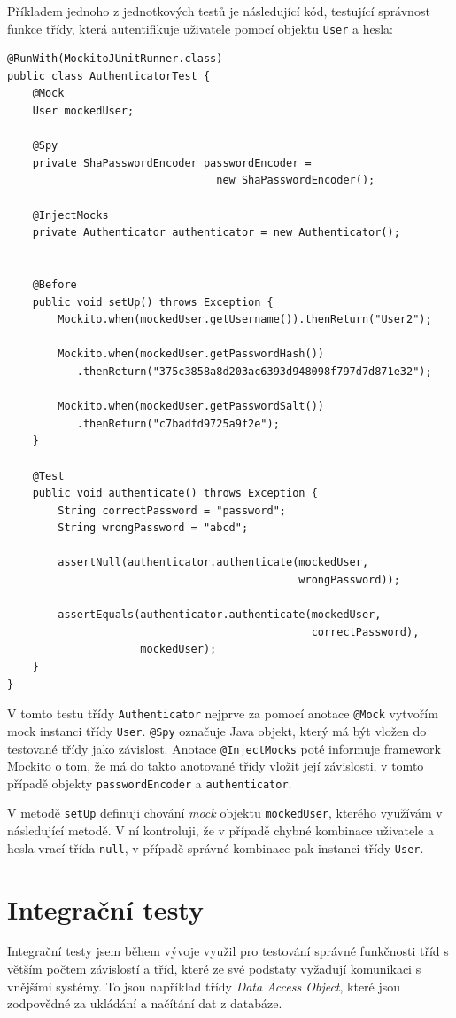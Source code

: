 \documentclass[thesis=B,czech]{FITthesis}[2012/06/26]
\begin{document}
		Příkladem jednoho z jednotkových testů je následující kód, testující správnost funkce třídy, která autentifikuje uživatele pomocí objektu \texttt{User} a hesla:
		
		\begin{Verbatim}[obeytabs,tabsize=2]
@RunWith(MockitoJUnitRunner.class)
public class AuthenticatorTest {
	@Mock
	User mockedUser;
	
	@Spy
	private ShaPasswordEncoder passwordEncoder = 
	                             new ShaPasswordEncoder();
	
	@InjectMocks
	private Authenticator authenticator = new Authenticator();
	
	
	@Before
	public void setUp() throws Exception {
		Mockito.when(mockedUser.getUsername()).thenReturn("User2");
		
		Mockito.when(mockedUser.getPasswordHash())
		   .thenReturn("375c3858a8d203ac6393d948098f797d7d871e32");
		       
		Mockito.when(mockedUser.getPasswordSalt())
		   .thenReturn("c7badfd9725a9f2e");
	}
	
	@Test
	public void authenticate() throws Exception {
		String correctPassword = "password";
		String wrongPassword = "abcd";
		
		assertNull(authenticator.authenticate(mockedUser, 
		                                      wrongPassword));
		                                      
		assertEquals(authenticator.authenticate(mockedUser, 
		                                        correctPassword), 
		             mockedUser);
	}
}
		\end{Verbatim}
		
				
		V tomto testu třídy \texttt{Authenticator} nejprve za pomocí anotace \texttt{@Mock} vytvořím mock instanci třídy \texttt{User}. \texttt{@Spy} označuje  Java objekt, který má být vložen do testované třídy jako závislost. Anotace \texttt{@InjectMocks} poté informuje framework Mockito o tom, že má do takto anotované třídy vložit její závislosti, v tomto případě objekty \texttt{passwordEncoder} a \texttt{authenticator}.
		
		V metodě \texttt{setUp} definuji chování \textit{mock} objektu \texttt{mockedUser}, kterého využívám v následující metodě. V ní kontroluji, že v případě chybné kombinace uživatele a hesla vrací třída \texttt{null}, v případě správné kombinace pak instanci třídy \texttt{User}.
		
		
		
	\section{Integrační testy}
		Integrační testy jsem během vývoje využil pro testování správné funkčnosti tříd s větším počtem závislostí a tříd, které ze své podstaty vyžadují komunikaci s vnějšími systémy. To jsou například třídy \textit{Data Access Object}, které jsou zodpovědné za ukládání a načítání dat z databáze.
		
\end{document}
